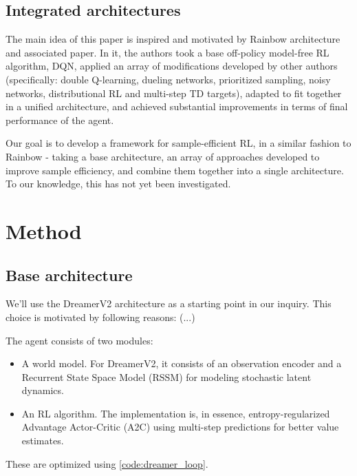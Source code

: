 \documentclass[twoside,11pt]{article}
\begin{document}
\subsection{Integrated architectures}

The main idea of this paper is inspired and motivated by Rainbow architecture and associated paper. In it, the authors took a base off-policy model-free RL algorithm, DQN, applied an array of modifications developed by other authors (specifically: double Q-learning, dueling networks, prioritized sampling, noisy networks, distributional RL and multi-step TD targets), adapted to fit together in a unified architecture, and achieved substantial improvements in terms of final performance of the agent.

Our goal is to develop a framework for sample-efficient RL, in a similar fashion to Rainbow - taking a base architecture, an array of approaches developed to improve sample efficiency, and combine them together into a single architecture. To our knowledge, this has not yet been investigated.

\section{Method}

\subsection{Base architecture}

We'll use the DreamerV2 architecture as a starting point in our inquiry. This choice is motivated by following reasons: (...)

The agent consists of two modules:

\begin{itemize}
  \item A world model. For DreamerV2, it consists of an observation encoder and a Recurrent State Space Model (RSSM) for modeling stochastic latent dynamics.
  \item An RL algorithm. The implementation is, in essence, entropy-regularized Advantage Actor-Critic (A2C) using multi-step predictions for better value estimates.
\end{itemize}

These are optimized using \autoref{code:dreamer_loop}.
\end{document}

